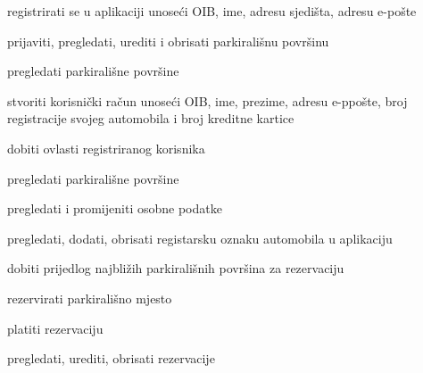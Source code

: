 			\begin{packed_enum}
				\item  {}
				
				\begin{packed_enum}
					
					\item registrirati se u aplikaciji unoseći OIB, ime, adresu sjedišta, adresu e-pošte 
					\item prijaviti, pregledati, urediti i obrisati parkirališnu površinu

				\end{packed_enum}
				
				\item  {}
				
				\begin{packed_enum}
					
					\item pregledati parkirališne površine
					\item stvoriti korisnički račun unoseći OIB, ime, prezime, adresu e-ppošte, broj registracije svojeg automobila i broj kreditne kartice
					\item dobiti ovlasti registriranog korisnika
					
				\end{packed_enum}
				
				\item  {}
				
				\begin{packed_enum}
			
					\item pregledati parkirališne površine
					\item pregledati i promijeniti osobne podatke
					\item pregledati, dodati, obrisati registarsku oznaku automobila u aplikaciju
					\item dobiti prijedlog najbližih parkirališnih površina za rezervaciju
					\item rezervirati parkirališno mjesto
					\item platiti rezervaciju
					\item pregledati, urediti, obrisati rezervacije

				\end{packed_enum}

				\item  {}
				

\end{packed_enum}

